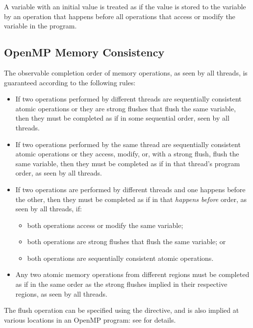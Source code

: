 A variable with an initial value is treated as if the value is stored to the
variable by an operation that happens before all operations that access or
modify the variable in the program.

\subsection{OpenMP Memory Consistency}
\label{subsec:OpenMP Memory Consistency}

The observable completion order of memory operations, as seen by all threads, 
is guaranteed according to the following rules:

\begin{itemize}
\item If two operations performed by different threads are sequentially
    consistent atomic operations or they are strong flushes that flush the
    same variable, then they must be completed as if in some sequential order,
    seen by all threads.
\item If two operations performed by the same thread are sequentially
    consistent atomic operations or they access, modify, or, with a strong
    flush, flush the same variable, then they must be completed as if in that
    thread's program order, as seen by all threads.
\item If two operations are performed by different threads and one happens
    before the other, then they must be completed as if in that 
    \emph{happens before} order, as seen by all threads, if:
    \begin{itemize}
        \item both operations access or modify the same variable;
        \item both operations are strong flushes that flush the same variable; or
        \item both operations are sequentially consistent atomic operations.
    \end{itemize}
\item Any two atomic memory operations from different  regions
    must be completed as if in the same order as the strong flushes
    implied in their respective regions, as seen by all threads.
\end{itemize}

The flush operation can be specified using the  directive, 
and is also implied at various locations in an OpenMP program: see 
 for details.

